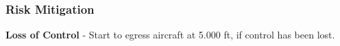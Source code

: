% 
% 
%
 \subsubsection*{Risk Mitigation}
 \begin{compactenum}
   \item \textbf{Loss of Control} - Start to egress aircraft at 5.000 ft, if control has been lost.
   \end{compactenum}